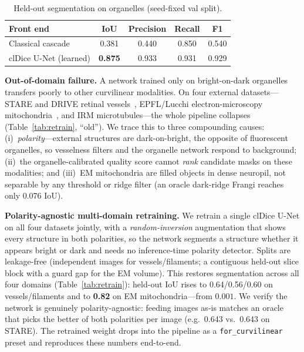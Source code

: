 \documentclass[runningheads]{llncs}
\begin{document}
\begin{table}[t]
\centering
\caption{Held-out segmentation on organelles (seed-fixed val split).}
\label{tab:seg}
\setlength{\tabcolsep}{7pt}
\begin{tabular}{lcccc}
\toprule
Front end & IoU & Precision & Recall & F1\\
\midrule
Classical cascade      & 0.381 & 0.440 & 0.850 & 0.540\\
clDice U-Net (learned) & \textbf{0.875} & 0.933 & 0.931 & 0.929\\
\bottomrule
\end{tabular}
\end{table}

\noindent\textbf{Out-of-domain failure.} A network trained only on
bright-on-dark organelles transfers poorly to other curvilinear modalities. On
four external datasets---STARE and DRIVE retinal vessels~\cite{stare,drive},
EPFL/Lucchi electron-microscopy mitochondria~\cite{lucchi}, and IRM
microtubules---the whole pipeline collapses (Table~\ref{tab:retrain}, ``old'').
We trace this to three compounding causes: (i)~\emph{polarity}---external
structures are dark-on-bright, the opposite of fluorescent organelles, so
vesselness filters and the organelle network respond to background; (ii)~the
organelle-calibrated quality score cannot \emph{rank} candidate masks on these
modalities; and (iii)~EM mitochondria are filled objects in dense neuropil, not
separable by any threshold or ridge filter (an oracle dark-ridge Frangi reaches
only 0.076 IoU).

\noindent\textbf{Polarity-agnostic multi-domain retraining.} We retrain a single
clDice U-Net on all four datasets jointly, with a \emph{random-inversion}
augmentation that shows every structure in both polarities, so the network
segments a structure whether it appears bright or dark and needs no
inference-time polarity detector. Splits are leakage-free (independent images
for vessels/filaments; a contiguous held-out slice block with a guard gap for
the EM volume). This restores segmentation across all four domains
(Table~\ref{tab:retrain}): held-out IoU rises to 0.64/0.56/0.60 on
vessels/filaments and to \textbf{0.82} on EM mitochondria---from $0.001$. We
verify the network is genuinely polarity-agnostic: feeding images as-is matches
an oracle that picks the better of both polarities per image (e.g.\ 0.643 vs.\
0.643 on STARE). The retrained weight drops into the pipeline as a
\texttt{for\_curvilinear} preset and reproduces these numbers end-to-end.
\end{document}
